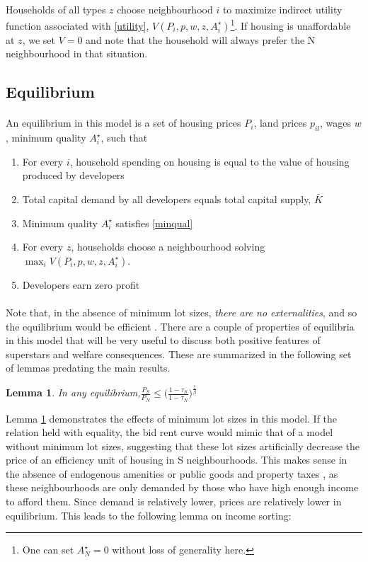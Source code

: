 \documentclass[]{article}
\theoremstyle{plain}
\newtheorem{lem}[thm]{Lemma}
\begin{document}
\paragraph*{}
Households of all types $z$ choose neighbourhood $i$ to maximize indirect utility function associated with \eqref{utility}, $V(P_{i}, p, w, z, A_{i}^{\star})$\footnote{One can set $A_{N}^{\star} = 0$ without loss of generality here.}. If housing is unaffordable at $z$, we set $V = 0$ and note that the household will always prefer the N neighbourhood in that situation. 

\subsection{Equilibrium}
\paragraph*{}
An equilibrium in this model is a set of housing prices $P_{i}$, land prices $p_{il}$, wages $w$, minimum quality $A_{i}^{\star}$, such that
\begin{enumerate}
	\item For every $i$, household spending on housing is equal to the value of housing produced by developers
	\item Total capital demand by all developers equals total capital supply, $\bar{K}$
	\item Minimum quality $A_{i}^{\star}$ satisfies \eqref{minqual}
    \item For every $z$, households choose a neighbourhood solving $\max_{i}V(P_{i}, p, w, z, A_{i}^{\star})$.
    \item Developers earn zero profit
\end{enumerate}
\paragraph*{}
Note that, in the absence of minimum lot sizes, \textit{there are no externalities}, and so the equilibrium would be efficient \citep{efficiency}. There are a couple of properties of equilibria in this model that will be very useful to discuss both positive features of superstars and welfare consequences. These are summarized in the following set of lemmas predating the main results. 
\begin{lem}\label{pricegradient}
In any equilibrium,$\frac{P_{S}}{P_{N}} \leq \bigg(\frac{1-\tau_{S}}{1-\tau_{N}}\bigg)^{\frac{1}{\beta}}$
\end{lem}
Lemma \ref{pricegradient} demonstrates the effects of minimum lot sizes in this model. If the relation held with equality, the bid rent curve would mimic that of a model without minimum lot sizes, suggesting that these lot sizes artificially decrease the price of an efficiency unit of housing in S neighbourhoods. This makes sense in the absence of endogenous amenities \citep{Coutureetal} or public goods and property taxes \citep{hamilton1976}, as these neighbourhoods are only demanded by those who have high enough income to afford them. Since demand is relatively lower, prices are relatively lower in equilibrium. This leads to the following lemma on income sorting:
\end{document}
